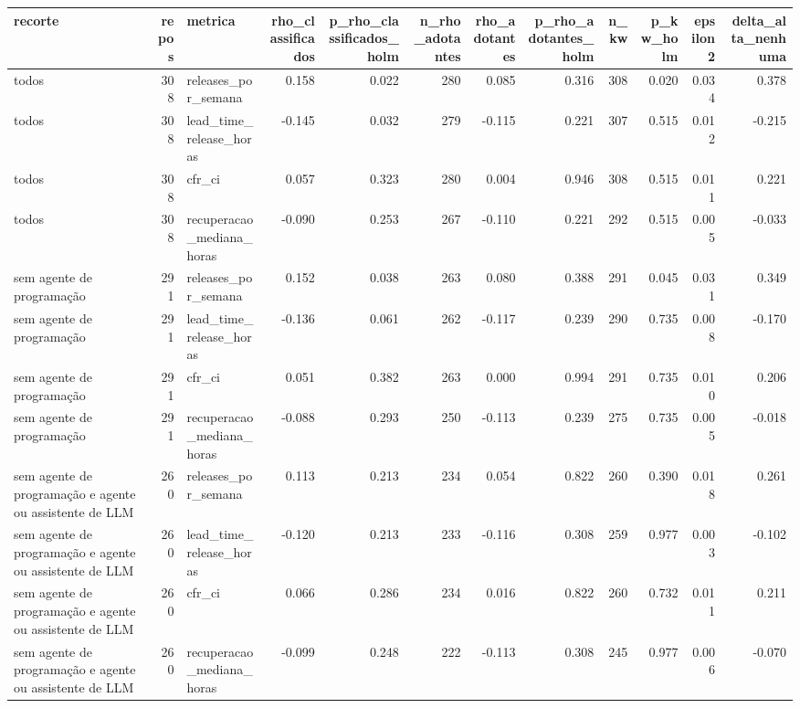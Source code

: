 \begin{tabular}{lrlrrrrrrrrr}
\toprule
recorte & repos & metrica & rho_classificados & p_rho_classificados_holm & n_rho_adotantes & rho_adotantes & p_rho_adotantes_holm & n_kw & p_kw_holm & epsilon2 & delta_alta_nenhuma \\
\midrule
todos & 308 & releases_por_semana & 0.158 & 0.022 & 280 & 0.085 & 0.316 & 308 & 0.020 & 0.034 & 0.378 \\
todos & 308 & lead_time_release_horas & -0.145 & 0.032 & 279 & -0.115 & 0.221 & 307 & 0.515 & 0.012 & -0.215 \\
todos & 308 & cfr_ci & 0.057 & 0.323 & 280 & 0.004 & 0.946 & 308 & 0.515 & 0.011 & 0.221 \\
todos & 308 & recuperacao_mediana_horas & -0.090 & 0.253 & 267 & -0.110 & 0.221 & 292 & 0.515 & 0.005 & -0.033 \\
sem agente de programação & 291 & releases_por_semana & 0.152 & 0.038 & 263 & 0.080 & 0.388 & 291 & 0.045 & 0.031 & 0.349 \\
sem agente de programação & 291 & lead_time_release_horas & -0.136 & 0.061 & 262 & -0.117 & 0.239 & 290 & 0.735 & 0.008 & -0.170 \\
sem agente de programação & 291 & cfr_ci & 0.051 & 0.382 & 263 & 0.000 & 0.994 & 291 & 0.735 & 0.010 & 0.206 \\
sem agente de programação & 291 & recuperacao_mediana_horas & -0.088 & 0.293 & 250 & -0.113 & 0.239 & 275 & 0.735 & 0.005 & -0.018 \\
sem agente de programação e agente ou assistente de LLM & 260 & releases_por_semana & 0.113 & 0.213 & 234 & 0.054 & 0.822 & 260 & 0.390 & 0.018 & 0.261 \\
sem agente de programação e agente ou assistente de LLM & 260 & lead_time_release_horas & -0.120 & 0.213 & 233 & -0.116 & 0.308 & 259 & 0.977 & 0.003 & -0.102 \\
sem agente de programação e agente ou assistente de LLM & 260 & cfr_ci & 0.066 & 0.286 & 234 & 0.016 & 0.822 & 260 & 0.732 & 0.011 & 0.211 \\
sem agente de programação e agente ou assistente de LLM & 260 & recuperacao_mediana_horas & -0.099 & 0.248 & 222 & -0.113 & 0.308 & 245 & 0.977 & 0.006 & -0.070 \\
\bottomrule
\end{tabular}
